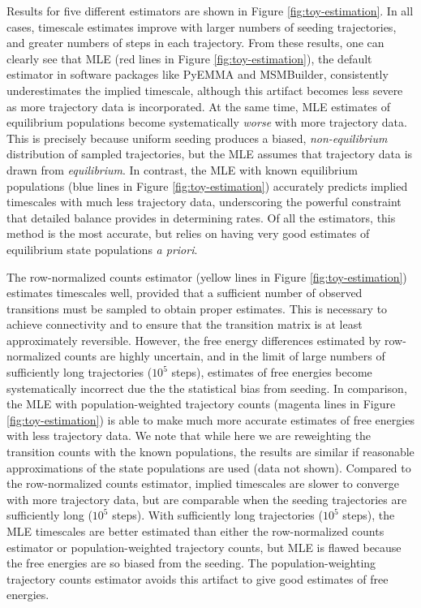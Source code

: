 \documentclass[%
 aip,
rsi,%
 amsmath,amssymb,
 reprint,%
]{revtex4-1}
\begin{document}
Results for five different estimators are shown in Figure \ref{fig:toy-estimation}.  In all cases, timescale estimates improve with larger numbers of seeding trajectories, and greater numbers of steps in each trajectory.  From these results, one can clearly see that MLE (red lines in Figure \ref{fig:toy-estimation}), the default estimator in software packages like PyEMMA\cite{Scherer:2015jb} and MSMBuilder\cite{Harrigan:2017gw}, consistently underestimates the implied timescale, although this artifact becomes less severe as more trajectory data is incorporated.  At the same time, MLE estimates of equilibrium populations become systematically \textit{worse} with more trajectory data.  This is precisely because uniform seeding produces a biased, \textit{non-equilibrium} distribution of sampled trajectories, but the MLE assumes that trajectory data is drawn from \textit{equilibrium}. In contrast, the MLE with known equilibrium populations (blue lines in Figure \ref{fig:toy-estimation}) accurately predicts implied timescales with much less trajectory data, underscoring the powerful constraint that detailed balance provides in determining rates.  Of all the estimators, this method is the most accurate, but relies on having very good estimates of equilibrium state populations \textit{a priori}.

The row-normalized counts estimator (yellow lines in Figure \ref{fig:toy-estimation}) estimates timescales well, provided that a sufficient number of observed transitions must be sampled to obtain proper estimates.  This is necessary to achieve connectivity and to ensure that the transition matrix is at least approximately reversible. However, the free energy differences estimated by row-normalized counts are highly uncertain, and in the limit of large numbers of sufficiently long trajectories ($10^5$ steps), estimates of free energies become systematically incorrect due the the statistical bias from seeding. In comparison, the MLE with population-weighted trajectory counts (magenta lines in Figure \ref{fig:toy-estimation}) is able to make much more accurate estimates of free energies with less trajectory data.  We note that while here we are reweighting the transition counts with the known populations, the results are similar if reasonable approximations of the state populations are used (data not shown). Compared to the row-normalized counts estimator, implied timescales are slower to converge with more trajectory data, but are comparable when the seeding trajectories are sufficiently long ($10^5$ steps).  With sufficiently long trajectories ($10^5$ steps), the MLE  timescales are better estimated than either the row-normalized counts estimator or population-weighted trajectory counts, but MLE is flawed because the free energies are so biased from the seeding.  The population-weighting trajectory counts estimator avoids this artifact to give good estimates of free energies.
\end{document}
